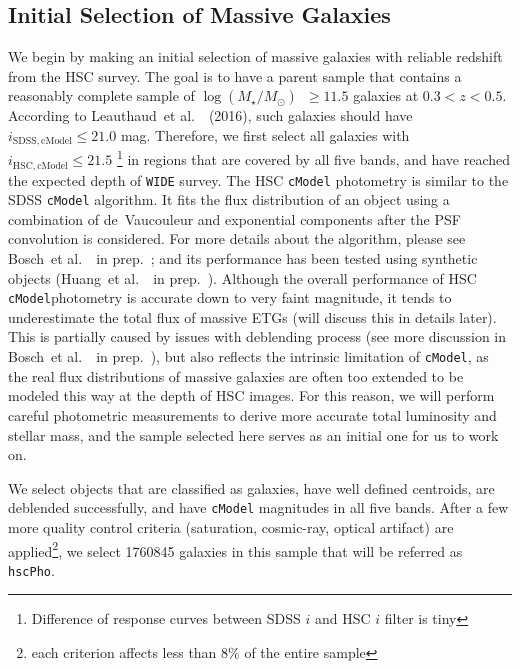 \documentclass[preprint]{aastex}
\def\etal{{\ et al.~}}
\def\cmodel{\texttt{cModel}}
\def\logms{{$\log (M_{\star}/M_{\odot})$}~}
\begin{document}
\begin{CJK*}{UTF8}{gbsn}
\subsection{Initial Selection of Massive Galaxies}
    
    We begin by making an initial selection of massive galaxies with reliable redshift from 
    the HSC survey.  
    The goal is to have a parent sample that contains a reasonably complete sample of 
    \logms$\geq 11.5$ galaxies at $0.3 < z < 0.5$. 
    According to Leauthaud\etal~(2016), such galaxies should have 
    $i_{\mathrm{SDSS, cModel}} \leq 21.0$ mag.
    Therefore, we first select all galaxies with $i_{\mathrm{HSC, cModel}} \leq 21.5$ 
    \footnote{Difference of response curves between SDSS $i$ and HSC $i$ filter is tiny}
    in regions that are covered by all five bands, and have reached the expected depth 
    of \texttt{WIDE} survey.  
    The HSC \texttt{cModel} photometry is similar to the SDSS \texttt{cModel} algorithm.  
    It fits the flux distribution of an object using a combination of de~Vaucouleur and 
    exponential components after the PSF convolution is considered.  
    For more details about the algorithm, please see Bosch\etal~in prep.~; and its 
    performance has been tested using synthetic objects (Huang\etal~in prep.~). 
    Although the overall performance of HSC \cmodel photometry is accurate down to very 
    faint magnitude, it tends to underestimate the total flux of massive ETGs 
    (will discuss this in details later). 
    This is partially caused by issues with deblending process (see more discussion in 
    Bosch\etal~in prep.~), but also reflects the intrinsic limitation of \cmodel, 
    as the real flux distributions of massive galaxies are often too extended to be 
    modeled this way at the depth of HSC images.  
    For this reason, we will perform careful photometric measurements to derive 
    more accurate total luminosity and stellar mass, and the sample selected here 
    serves as an initial one for us to work on.
    
    We select objects that are classified as galaxies, have well defined centroids, 
    are deblended successfully, and have \texttt{cModel} magnitudes in all five bands. 
    After a few more quality control criteria (saturation, cosmic-ray, optical artifact)
    are applied\footnote{each criterion affects less than 8\% of the entire sample}, 
    we select 1760845 galaxies in this sample that will be referred as \texttt{hscPho}. 
        

\end{CJK*}
\end{document}
